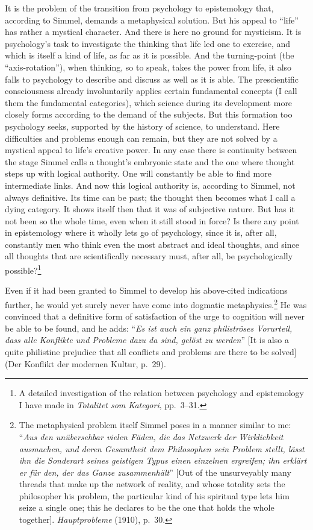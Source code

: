 \documentclass[12pt]{book}
\newcommand{\opage}[1]{\marginnote{\footnotesize\textit{[#1]}}}
\begin{document}
It is the problem of the transition from psychology to epistemology that, according to Simmel, demands a
metaphysical solution. But his appeal to ``life'' has rather a mystical character. And there is here no ground for
mysticism. It is psychology's task to investigate the thinking that life led one to exercise, and which is itself
a kind of life, as far as it is possible. And the turning-point (the ``axis-rotation''), \opage{94}when thinking, so to
speak, takes the power from life, it also falls to psychology to describe and discuss as well as it is able. The
prescientific consciousness already involuntarily applies certain fundamental concepts (I call them the
fundamental categories), which science during its development more closely forms according to the demand of the
subjects. But this formation too psychology seeks, supported by the history of science, to understand. Here
difficulties and problems enough can remain, but they are not solved by a mystical appeal to life's creative
power. In any case there is continuity between the stage Simmel calls a thought's embryonic state and the one
where thought steps up with logical authority. One will constantly be able to find more intermediate links. And
now this logical authority is, according to Simmel, not always definitive. Its time can be past; the thought then
becomes what I call a dying category. It shows itself then that it was of subjective nature. But has it not been so
the whole time, even when it still stood in force? Is there any point in epistemology where it wholly lets go of
psychology, since it is, after all, constantly men who think even the most abstract and ideal thoughts, and since
all thoughts that are scientifically necessary must, after all, be psychologically possible?\footnote{A detailed
investigation of the relation between psychology and epistemology I have made in \textit{Totalitet som Kategori},
pp.\ 3--31.}

Even if it had been granted to Simmel to develop his above-cited indications further, he would yet surely never
have come into dogmatic metaphysics.\footnote{The metaphysical problem itself Simmel poses in a manner similar to
me: ``\textit{Aus den unübersehbar vielen Fäden, die das Netzwerk der Wirklichkeit ausmachen, und deren
Gesamtheit dem Philosophen sein Problem stellt, lässt ihn die Sonderart seines geistigen Typus einen einzelnen
ergreifen; ihn erklärt er für den, der das Ganze zusammenhält}'' [Out of the unsurveyably many threads that make
up the network of reality, and whose totality sets the philosopher his problem, the particular kind of his
spiritual type lets him seize a single one; this he declares to be the one that holds the whole together].
\textit{Hauptprobleme} (1910), p.\ 30.} He \opage{95}was convinced that a definitive form of satisfaction of the urge to
cognition will never be able to be found, and he adds: ``\textit{Es ist auch ein ganz philiströses Vorurteil, dass
alle Konflikte und Probleme dazu da sind, gelöst zu werden}'' [It is also a quite philistine prejudice that all
conflicts and problems are there to be solved] (Der Konflikt der modernen Kultur, p.\ 29).
\end{document}
